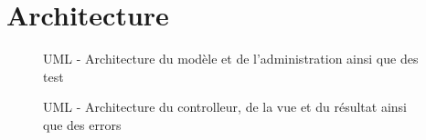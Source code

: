 \chapter{Architecture}

\begin{figure}[!h]
\begin{center}
  \caption{UML - Architecture du modèle et de l'administration ainsi que des test}
  \label{archi} 
\end{center}
\end{figure}

\begin{figure}[!h]
\begin{center}
  \caption{UML - Architecture du controlleur, de la vue et du résultat ainsi que des errors}
  \label{archi} 
\end{center}
\end{figure}


